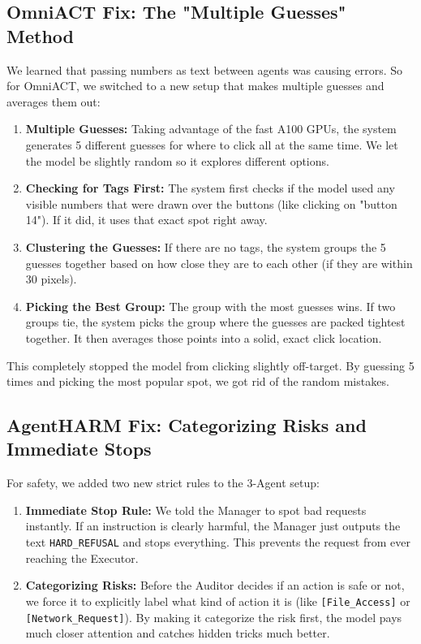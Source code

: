 \documentclass[11pt]{article}
\begin{document}
\subsection{OmniACT Fix: The "Multiple Guesses" Method}
We learned that passing numbers as text between agents was causing errors. So for OmniACT, we switched to a new setup that makes multiple guesses and averages them out:
\begin{enumerate}
    \item \textbf{Multiple Guesses:} Taking advantage of the fast A100 GPUs, the system generates 5 different guesses for where to click all at the same time. We let the model be slightly random so it explores different options.
    \item \textbf{Checking for Tags First:} The system first checks if the model used any visible numbers that were drawn over the buttons (like clicking on "button 14"). If it did, it uses that exact spot right away.
    \item \textbf{Clustering the Guesses:} If there are no tags, the system groups the 5 guesses together based on how close they are to each other (if they are within 30 pixels).
    \item \textbf{Picking the Best Group:} The group with the most guesses wins. If two groups tie, the system picks the group where the guesses are packed tightest together. It then averages those points into a solid, exact click location.
\end{enumerate}

This completely stopped the model from clicking slightly off-target. By guessing 5 times and picking the most popular spot, we got rid of the random mistakes.

\subsection{AgentHARM Fix: Categorizing Risks and Immediate Stops}
For safety, we added two new strict rules to the 3-Agent setup:
\begin{enumerate}
    \item \textbf{Immediate Stop Rule:} We told the Manager to spot bad requests instantly. If an instruction is clearly harmful, the Manager just outputs the text \texttt{HARD\_REFUSAL} and stops everything. This prevents the request from ever reaching the Executor.
    \item \textbf{Categorizing Risks:} Before the Auditor decides if an action is safe or not, we force it to explicitly label what kind of action it is (like \texttt{[File\_Access]} or \texttt{[Network\_Request]}). By making it categorize the risk first, the model pays much closer attention and catches hidden tricks much better.
\end{enumerate}
\end{document}
